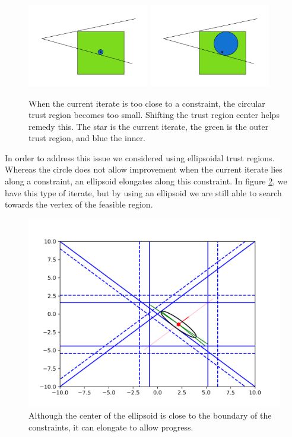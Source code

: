 \begin{figure}[ht]
    \centering
    \includegraphics[width=200px]{images/small_circle.png}
    \includegraphics[width=200px]{images/shifted_center.png}
    \caption[The advantage of not requiring the sample region center to be the trust region center.]{
    	When the current iterate is too close to a constraint, the circular trust region becomes too small.
    	Shifting the trust region center helps remedy this.
    	The star is the current iterate, the green is the outer trust region, and blue the inner.
    }
    \label{options_basis}
\end{figure}


In order to address this issue we considered using ellipsoidal trust regions.
Whereas the circle does not allow improvement when the current iterate lies along a constraint, an ellipsoid elongates along this constraint.
In figure \cref{ellipse_adv}, we have this type of iterate, but by using an ellipsoid we are still able to search towards the vertex of the feasible region.
\begin{figure}[ht]
    \centering
    \includegraphics[scale=0.4]{images/advantage_of_ellipse_2.png}
    \caption[An ellipsoidal trust region allows for more progress than a circular trust region.] {
    	Although the center of the ellipsoid is close to the boundary of the constraints, it can elongate to allow progress.
    }
    \label{ellipse_adv}
\end{figure}


